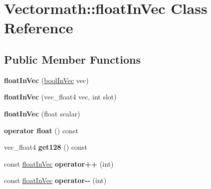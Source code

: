 \hypertarget{classVectormath_1_1floatInVec}{\section{Vectormath\-:\-:float\-In\-Vec Class Reference}
\label{classVectormath_1_1floatInVec}
}
\subsection*{Public Member Functions}
\begin{DoxyCompactItemize}
\item 
\hypertarget{classVectormath_1_1floatInVec_afaa5f27e47ae2f7c1eabfc721b2619bb}{{\bfseries float\-In\-Vec} (\hyperlink{classVectormath_1_1boolInVec}{bool\-In\-Vec} vec)}\label{classVectormath_1_1floatInVec_afaa5f27e47ae2f7c1eabfc721b2619bb}

\item 
\hypertarget{classVectormath_1_1floatInVec_a2a8e60a628d7fddb74c4941d6c296f43}{{\bfseries float\-In\-Vec} (vec\-\_\-float4 vec, int slot)}\label{classVectormath_1_1floatInVec_a2a8e60a628d7fddb74c4941d6c296f43}

\item 
\hypertarget{classVectormath_1_1floatInVec_a0d9fe72973e2d8393e29bc5891fc0549}{{\bfseries float\-In\-Vec} (float scalar)}\label{classVectormath_1_1floatInVec_a0d9fe72973e2d8393e29bc5891fc0549}

\item 
\hypertarget{classVectormath_1_1floatInVec_adf55ff2bb10f7412fc5862e55ec8be48}{{\bfseries operator float} () const }\label{classVectormath_1_1floatInVec_adf55ff2bb10f7412fc5862e55ec8be48}

\item 
\hypertarget{classVectormath_1_1floatInVec_a87ad582e3358231281651152eb26db32}{vec\-\_\-float4 {\bfseries get128} () const }\label{classVectormath_1_1floatInVec_a87ad582e3358231281651152eb26db32}

\item 
\hypertarget{classVectormath_1_1floatInVec_adf90abe101b93990227e5e7ea879bdb7}{const \hyperlink{classVectormath_1_1floatInVec}{float\-In\-Vec} {\bfseries operator++} (int)}\label{classVectormath_1_1floatInVec_adf90abe101b93990227e5e7ea879bdb7}

\item 
\hypertarget{classVectormath_1_1floatInVec_a73b9b6bb31e6e833de65a797e3d45dba}{const \hyperlink{classVectormath_1_1floatInVec}{float\-In\-Vec} {\bfseries operator-\/-\/} (int)}\label{classVectormath_1_1floatInVec_a73b9b6bb31e6e833de65a797e3d45dba}


\end{DoxyCompactItemize}

